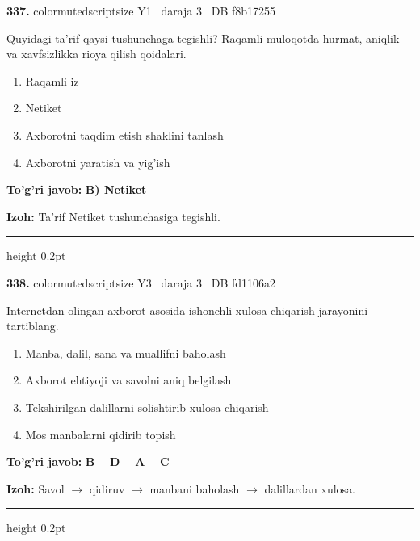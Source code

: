 \documentclass[10pt,a4paper,oneside]{article}
\begin{document}
\noindent\textbf{\color{ink}337.}  {color{muted}scriptsize Y1 \textbullet\ daraja 3 \textbullet\ DB f8b17255}
\par
Quyidagi ta'rif qaysi tushunchaga tegishli? Raqamli muloqotda hurmat, aniqlik va xavfsizlikka rioya qilish qoidalari.
\begin{enumerate}[label=\Alph*),leftmargin=9mm]
\item Raqamli iz
\item Netiket
\item Axborotni taqdim etish shaklini tanlash
\item Axborotni yaratish va yig'ish
\end{enumerate}
\begin{tcolorbox}[enhanced,breakable,colback=teal!4,colframe=teal!50!black,boxrule=0.5pt,arc=1.1mm,left=3mm,right=3mm,top=1.7mm,bottom=1.7mm,before skip=2mm,after skip=2mm]
\textbf{\color{teal}To'g'ri javob:} \textbf{B) Netiket}
\par\smallskip
\textbf{Izoh:} Ta'rif Netiket tushunchasiga tegishli.
\end{tcolorbox}
\vspace{2mm}\hrule height 0.2pt \vspace{3mm}

\noindent\textbf{\color{ink}338.}  {color{muted}scriptsize Y3 \textbullet\ daraja 3 \textbullet\ DB fd1106a2}
\par
Internetdan olingan axborot asosida ishonchli xulosa chiqarish jarayonini tartiblang.
\begin{enumerate}[label=\Alph*),leftmargin=9mm]
\item Manba, dalil, sana va muallifni baholash
\item Axborot ehtiyoji va savolni aniq belgilash
\item Tekshirilgan dalillarni solishtirib xulosa chiqarish
\item Mos manbalarni qidirib topish
\end{enumerate}
\begin{tcolorbox}[enhanced,breakable,colback=teal!4,colframe=teal!50!black,boxrule=0.5pt,arc=1.1mm,left=3mm,right=3mm,top=1.7mm,bottom=1.7mm,before skip=2mm,after skip=2mm]
\textbf{\color{teal}To'g'ri javob:} \textbf{B -- D -- A -- C}
\par\smallskip
\textbf{Izoh:} Savol \ensuremath{\to} qidiruv \ensuremath{\to} manbani baholash \ensuremath{\to} dalillardan xulosa.
\end{tcolorbox}
\vspace{2mm}\hrule height 0.2pt \vspace{3mm}
\end{document}
